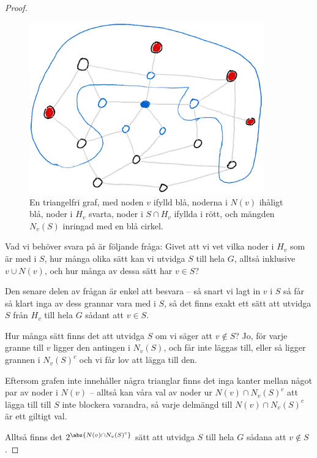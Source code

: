 \documentclass[nobib]{tufte-handout}
\begin{document}
\begin{lemma}
\begin{proof}
    \begin{figure}
      \centering
      \includegraphics[width=0.9\textwidth]{graphics/independent_sets_in_triangle_free_graphs.png}
      \caption{En triangelfri graf, med noden $v$ ifylld blå, noderna i $N(v)$ ihåligt blå, noder i $H_v$ svarta, noder i $S \cap H_v$ ifyllda i rött, och mängden $N_v(S)$ inringad med en blå cirkel.}
      \label{fig:triangle_free_graph}
    \end{figure}

    Vad vi behöver svara på är följande fråga: Givet att vi vet vilka noder i $H_v$ som är med i $S$, hur många olika sätt kan vi utvidga $S$ till hela $G$, alltså inklusive $v \cup N(v)$, och hur många av dessa sätt har $v \in S$?

    Den senare delen av frågan är enkel att besvara -- så snart vi lagt in $v$ i $S$ så får så klart inga av dess grannar vara med i $S$, så det finns exakt ett sätt att utvidga $S$ från $H_v$ till hela $G$ sådant att $v \in S$.

    Hur många sätt finns det att utvidga $S$ om vi säger att $v \not\in S$? Jo, för varje granne till $v$ ligger den antingen i $N_v(S)$, och får inte läggas till, eller så ligger grannen i $N_v(S)^c$ och vi får lov att lägga till den. 
    
    Eftersom grafen inte innehåller några trianglar finns det inga kanter mellan något par av noder i $N(v)$ -- alltså kan våra val av noder ur $N(v) \cap N_v(S)^c$ att lägga till till $S$ inte blockera varandra, så varje delmängd till $N(v) \cap N_v(S)^c$ är ett giltigt val.

    Alltså finns det $2^{\abs{N(v) \cap N_v(S)^c}}$ sätt att utvidga $S$ till hela $G$ sådana att $v \not \in S$.


\end{proof}
\end{lemma}
\end{document}
